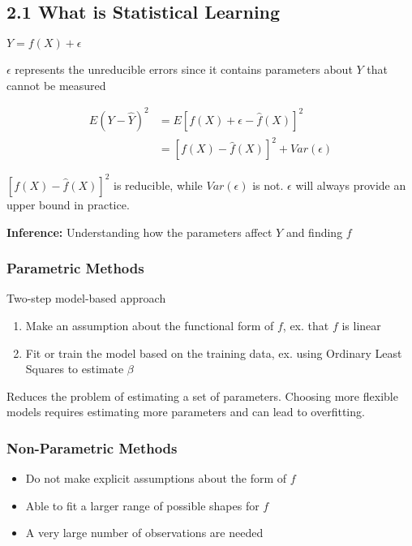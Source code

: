 \documentclass[
]{article}
\author{}
\date{}
\begin{document}
\hypertarget{header-n0}{%
\subsection{2.1 What is Statistical Learning}\label{header-n0}}

\(Y = f(X) + \epsilon\)

\(\epsilon\) represents the unreducible errors since it contains
parameters about \(Y\) that cannot be measured

\begin{align}
E(Y-\hat{Y})^2 &= E[f(X)+\epsilon-\hat{f}(X)]^2 \\
&= [f(X) - \hat{f}(X)]^2 + Var(\epsilon)
\end{align}

\([f(X) - \hat{f}(X)]^2\) is reducible, while \(Var(\epsilon)\) is not.
\(\epsilon\) will always provide an upper bound in practice.

\textbf{Inference: }Understanding how the parameters affect \(Y\) and
finding \(f\)

\hypertarget{header-n8}{%
\subsubsection{Parametric Methods}\label{header-n8}}

Two-step model-based approach

\begin{enumerate}
\def\labelenumi{\arabic{enumi}.}
\item
  Make an assumption about the functional form of \(f\), ex. that \(f\)
  is linear
\item
  Fit or train the model based on the training data, ex. using Ordinary
  Least Squares to estimate \(\beta\)
\end{enumerate}

Reduces the problem of estimating a set of parameters. Choosing more
flexible models requires estimating more parameters and can lead to
overfitting.

\hypertarget{header-n16}{%
\subsubsection{Non-Parametric Methods}\label{header-n16}}

\begin{itemize}
\item
  Do not make explicit assumptions about the form of \(f\)
\item
  Able to fit a larger range of possible shapes for \(f\)
\item
  A very large number of observations are needed
\end{itemize}
\end{document}
